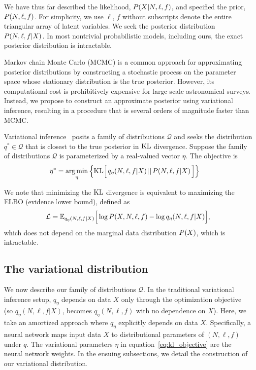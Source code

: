 We have thus far described the likelihood,
$P(X | N, \ell, f)$, and specified the prior, $P(N, \ell, f)$. 
For simplicity, we use $\ell$, $f$ without subscripts  
denote the entire triangular array of latent variables. 
We seek the posterior distribution 
$P(N, \ell, f | X)$. In most nontrivial probabilistic models, including ours, the exact posterior distribution is intractable.

Markov chain Monte Carlo (MCMC) is a common approach for approximating
posterior distributions by constructing a stochastic process on the parameter space whose stationary distribution is the true posterior. 
However, its computational cost is prohibitively expensive for
large-scale astronomical surveys. Instead, we propose to construct an approximate posterior using variational inference, resulting in a procedure that is several orders of magnitude faster than MCMC.

Variational inference~\cite{Blei_2017_vi_review, Jordan_intro_vi, Wainwrite_graph_models_vi}
posits a family of distributions $\mathcal{Q}$ and seeks
the distribution $q^*\in \mathcal{Q}$ that is closest to the true posterior
in $\textrm{KL}$ divergence. Suppose the family of distributions $\mathcal{Q}$ is parameterized by a real-valued vector $\eta$. The objective is 
\begin{align}
   \eta^* &= \operatorname*{arg\,min}_{\eta} \Big\{ \mathrm{KL}\Big[\,q_\eta(N, \ell, f | X)\, \| \,P(N, \ell, f | X )\,\Big]\Big\} 
   \label{eq:kl_objective}
\end{align}

We note that minimizing the $\textrm{KL}$ divergence is equivalent to maximizing the ELBO (evidence lower bound), defined as 
\begin{align}
    \mathcal{L} = 
    \mathbb{E}_{q_\eta(N, \ell, f | X)}\Big[\log P(X, N, \ell, f) - \log q_\eta(N, \ell, f | X)\Big],
    \label{eq:elbo}
\end{align}
which does not depend on the marginal data distribution $P(X)$, which is intractable. 

\subsection{The variational distribution}
We now describe our family of distributions $\mathcal{Q}$. 
In the traditional variational inference setup, 
$q_\eta$ depends on data $X$ only through the optimization objective 
(so $q_\eta(N, \ell, f | X)$,
becomes $q_\eta(N, \ell, f)$ with no dependence on $X$). 
Here, we take an amortized approach where
$q_\eta$ explicitly depends on data $X$. Specifically, a neural network 
maps input data $X$ to distributional parameters of $(N, \ell, f)$ 
under $q$. The variational parameters $\eta$ in equation~\eqref{eq:kl_objective} 
are the neural network weights. 
In the ensuing subsections, we detail the construction of our variational distribution. 

